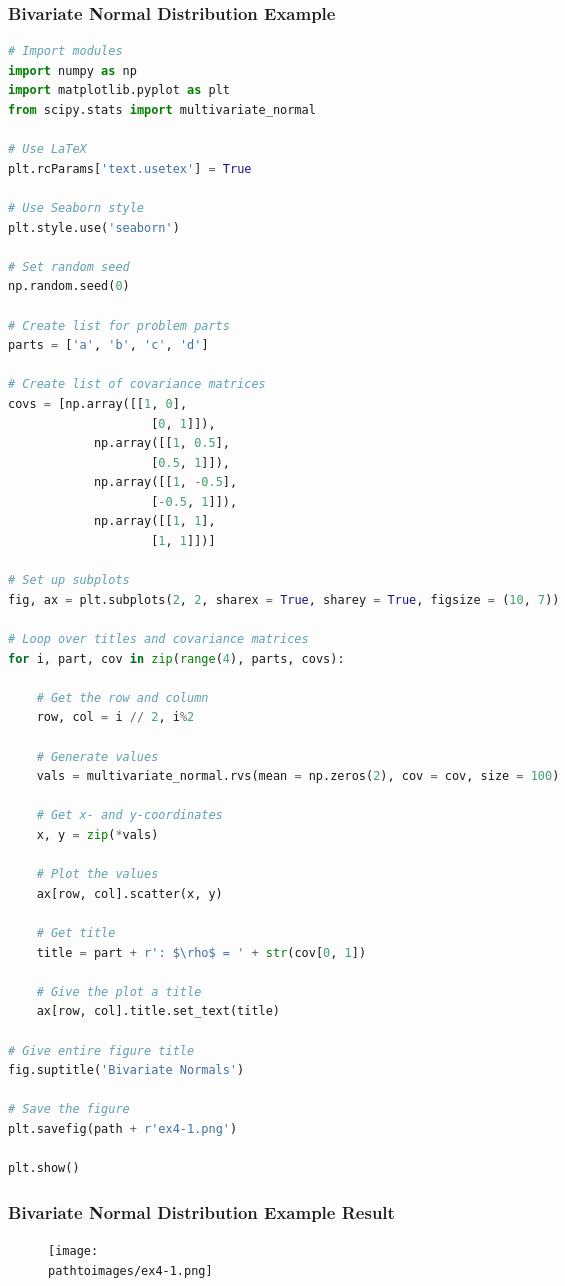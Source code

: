 \documentclass{beamer}
\newcommand{\pathtoimages}{/Users/charlesrambo/Desktop/Bootcamp24/Images}
\begin{document}
\begin{frame}[fragile]
\frametitle{Bivariate Normal Distribution Example}
\begin{multicols}{2}
\begin{lstlisting}[language=Python]
# Import modules
import numpy as np
import matplotlib.pyplot as plt
from scipy.stats import multivariate_normal

# Use LaTeX
plt.rcParams['text.usetex'] = True

# Use Seaborn style
plt.style.use('seaborn')

# Set random seed
np.random.seed(0)

# Create list for problem parts
parts = ['a', 'b', 'c', 'd']

# Create list of covariance matrices
covs = [np.array([[1, 0], 
					[0, 1]]), 
        	np.array([[1, 0.5], 
					[0.5, 1]]), 
        	np.array([[1, -0.5], 
					[-0.5, 1]]), 
        	np.array([[1, 1], 
					[1, 1]])]

# Set up subplots
fig, ax = plt.subplots(2, 2, sharex = True, sharey = True, figsize = (10, 7))

# Loop over titles and covariance matrices 
for i, part, cov in zip(range(4), parts, covs):
    
    # Get the row and column
    row, col = i // 2, i%2

    # Generate values
    vals = multivariate_normal.rvs(mean = np.zeros(2), cov = cov, size = 100)
    
    # Get x- and y-coordinates
    x, y = zip(*vals)
    
    # Plot the values
    ax[row, col].scatter(x, y)
    
    # Get title
    title = part + r': $\rho$ = ' + str(cov[0, 1])
    
    # Give the plot a title
    ax[row, col].title.set_text(title)

# Give entire figure title
fig.suptitle('Bivariate Normals')

# Save the figure
plt.savefig(path + r'ex4-1.png')

plt.show()
\end{lstlisting}
\end{multicols}
\end{frame}

\begin{frame}
\frametitle{Bivariate Normal Distribution Example Result}
\begin{figure}
\centering
\texttt{[image: \\pathtoimages/ex4-1.png]}
\end{figure}
\end{frame}
\end{document}

